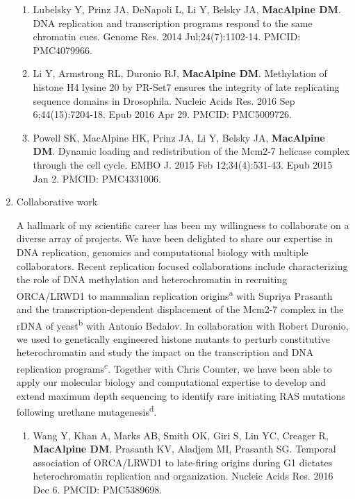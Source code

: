 \documentclass{nihbiosketch}
\begin{document}
\begin{enumerate}
\begin{enumerate}
\item Lubelsky Y, Prinz JA, DeNapoli L, Li Y, Belsky JA, \textbf{MacAlpine DM}. DNA
replication and transcription programs respond to the same chromatin cues. Genome Res. 2014 Jul;24(7):1102-14. PMCID: PMC4079966.

\item Li Y, Armstrong RL, Duronio RJ, \textbf{MacAlpine DM}. Methylation of histone H4 lysine 20 by PR-Set7 ensures the integrity of late replicating sequence domains in Drosophila. Nucleic Acids Res. 2016 Sep 6;44(15):7204-18.  Epub 2016 Apr 29. PMCID: PMC5009726.

\item Powell SK, MacAlpine HK, Prinz JA, Li Y, Belsky JA, \textbf{MacAlpine DM}. Dynamic
loading and redistribution of the Mcm2-7 helicase complex through the cell cycle. EMBO J. 2015 Feb 12;34(4):531-43. Epub 2015 Jan 2. PMCID: PMC4331006.


\end{enumerate}

\item Collaborative work

\noindent A hallmark of my scientific career has been my willingness to collaborate on a diverse array of projects.  We have been delighted to share our expertise in DNA replication, genomics and computational biology with multiple collaborators.  Recent replication focused collaborations include characterizing the role of DNA methylation and heterochromatin in recruiting ORCA/LRWD1 to mammalian replication origins\textsuperscript{a} with Supriya Prasanth and the transcription-dependent displacement of the Mcm2-7 complex in the rDNA of yeast\textsuperscript{b} with Antonio Bedalov.  In collaboration with Robert Duronio, we used to genetically engineered histone mutants to perturb  constitutive heterochromatin and study the impact on the transcription and DNA replication programs\textsuperscript{c}.  Together with Chris Counter, we have been able to apply our molecular biology and computational expertise to develop and extend maximum depth sequencing to identify rare initiating RAS mutations following urethane mutagenesis\textsuperscript{d}.  



\begin{enumerate}
\setlength\itemsep{0.35em}


\item Wang Y, Khan A, Marks AB, Smith OK, Giri S, Lin YC, Creager R, \textbf{MacAlpine DM},
Prasanth KV, Aladjem MI, Prasanth SG. Temporal association of ORCA/LRWD1 to
late-firing origins during G1 dictates heterochromatin replication and
organization. Nucleic Acids Res. 2016 Dec 6. PMCID: PMC5389698.



\end{enumerate}
\end{enumerate}
\end{document}
